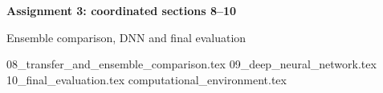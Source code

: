 \documentclass[a4paper,11pt]{article}
\begin{document}
\begin{center}
    {\Large\bfseries Assignment 3: coordinated sections 8--10}\par
    \small Ensemble comparison, DNN and final evaluation
\end{center}
\setcounter{section}{7}
{08_transfer_and_ensemble_comparison.tex}
{09_deep_neural_network.tex}
{10_final_evaluation.tex}
\printbibliography[heading=bibintoc,title={References}]
\clearpage
\appendix
{computational_environment.tex}
\end{document}
